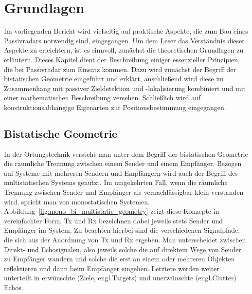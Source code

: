 \chapter{Grundlagen}\label{chp:theory_of_operation}

Im vorliegenden Bericht wird vielseitig auf praktische Aspekte, die zum Bau eines Passivradars notwendig sind, eingegangen. Um dem Leser das Verständnis dieser Aspekte zu erleichtern, ist es sinnvoll, zunächst die theoretischen Grundlagen zu erläutern. Dieses Kapitel dient der Beschreibung einiger essenzieller Prinzipien, die bei Passivradar zum Einsatz kommen. Dazu wird zunächst der Begriff der bistatischen Geometrie eingeführt und erklärt, anschließend wird diese im Zusammenhang mit passiver Zieldetektion und -lokalisierung kombiniert und mit einer mathematischen Beschreibung versehen. Schließlich wird auf konstruktionsabhängige Eigenarten zur Positionsbestimmung eingegangen.

\section{Bistatische Geometrie}\label{sct:bistatic_geometry}

In der Ortungstechnik versteht man unter dem Begriff der bistatischen Geometrie die räumliche Trennung zwischen einem Sender und einem Empfänger. Bezogen auf Systeme mit mehreren Sendern und Empfängern wird auch der Begriff des multistatischen Systems genutzt. Im umgekehrten Fall, wenn die räumliche Trennung zwischen Sender und Empfänger als vernachlässigbar klein verstanden wird, spricht man von monostatischen Systemen. Abbildung~\ref{fig:mono_bi_multistatic_geometry} zeigt diese Konzepte in vereinfachter Form. Tx und Rx bezeichnen dabei jeweils stets Sender und Empfänger im System. Zu beachten hierbei sind die verschiedenen Signalpfade, die sich aus der Anordnung von Tx und Rx ergeben. Man unterscheidet zwischen Direkt- und Echosignalen, also jeweils solche die auf direktem Wege von Sender zu Empfänger wandern und solche die erst an einem oder mehreren Objekten reflektieren und dann beim Empfänger eingehen. Letztere werden weiter unterteilt in erwünschte (Ziele, engl.\@ Targets) und unerwünschte (engl.\@ Clutter) Echos.

